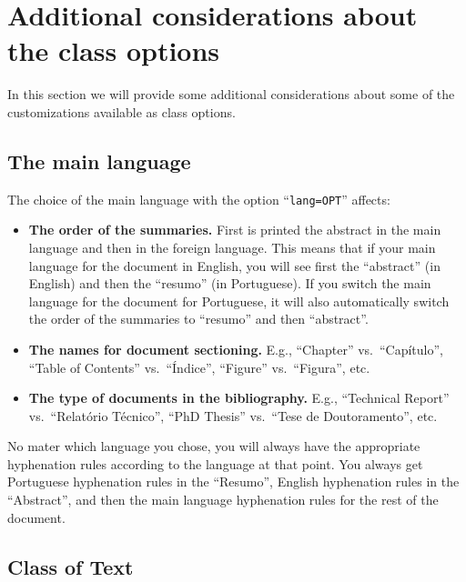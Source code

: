 \section{Additional considerations about the class options}
\label{sec:additional_considerations}

In this section we will provide some additional considerations about some of the customizations available as class options.

\subsection{The main language}
\label{sub:the_main_language}

The choice of the main language with the option “\texttt{lang=OPT}” affects:

\begin{itemize}
  \item \textbf{The order of the summaries.} First is printed the abstract in the main language and then in the foreign language. This means that if your main language for the document in English, you will see first the “abstract” (in English) and then the “resumo” (in Portuguese). If you switch the main language for the document for Portuguese, it will also automatically switch the order of the summaries to “resumo” and then “abstract”.
  \item \textbf{The names for document sectioning.} E.g., ``Chapter'' vs.\ ``Capítulo'', ``Table of Contents'' vs.\ ``Índice'', ``Figure'' vs.\ ``Figura'', etc.
  \item \textbf{The type of documents in the bibliography.} E.g., ``Technical Report'' vs.\ ``Relatório Técnico'', ``PhD Thesis'' vs.\ ``Tese de Doutoramento'', etc.
\end{itemize}

No mater which language you chose, you will always have the appropriate hyphenation rules according to the language at that point. You always get Portuguese hyphenation rules in the ``Resumo'', English hyphenation rules in the ``Abstract'', and then the main language hyphenation rules for the rest of the document.




\subsection{Class of Text}
\label{sub:class_of_text}

